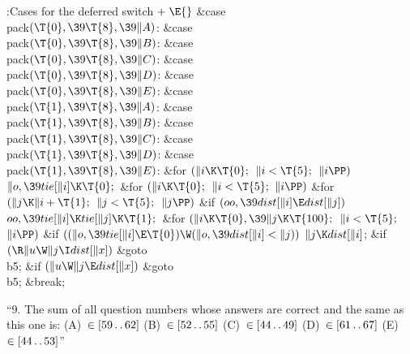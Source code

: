 \B{}:Cases for the deferred switch\X${}\mathrel+\E{}$\6
\4\&{case} \\{pack}${}(\T{0},\39\T{8},\39\|A){}$:\5
\&{case} \\{pack}${}(\T{0},\39\T{8},\39\|B){}$:\5
\&{case} \\{pack}${}(\T{0},\39\T{8},\39\|C){}$:\5
\&{case} \\{pack}${}(\T{0},\39\T{8},\39\|D){}$:\5
\&{case} \\{pack}${}(\T{0},\39\T{8},\39\|E){}$:\5
\&{case} \\{pack}${}(\T{1},\39\T{8},\39\|A){}$:\5
\&{case} \\{pack}${}(\T{1},\39\T{8},\39\|B){}$:\5
\&{case} \\{pack}${}(\T{1},\39\T{8},\39\|C){}$:\5
\&{case} \\{pack}${}(\T{1},\39\T{8},\39\|D){}$:\5
\&{case} \\{pack}${}(\T{1},\39\T{8},\39\|E){}$:\5
\&{for} ${}(\|i\K\T{0};{}$ ${}\|i<\T{5};{}$ ${}\|i\PP){}$\1\5
${}\|o,\39\\{tie}[\|i]\K\T{0};{}$\2\6
\&{for} ${}(\|i\K\T{0};{}$ ${}\|i<\T{5};{}$ ${}\|i\PP){}$\1\6
\&{for} ${}(\|j\K\|i+\T{1};{}$ ${}\|j<\T{5};{}$ ${}\|j\PP){}$\1\6
\&{if} ${}(\\{oo},\39\\{dist}[\|i]\E\\{dist}[\|j]){}$\1\5
${}\\{oo},\39\\{tie}[\|i]\K\\{tie}[\|j]\K\T{1};{}$\2\2\2\6
\&{for} ${}(\|i\K\T{0},\39\|j\K\T{100};{}$ ${}\|i<\T{5};{}$ ${}\|i\PP){}$\1\6
\&{if} ${}((\|o,\39\\{tie}[\|i]\E\T{0})\W(\|o,\39\\{dist}[\|i]<\|j)){}$\1\5
${}\|j\K\\{dist}[\|i]{}$;\2\2\6
\&{if} ${}(\R\|u\W\|j\I\\{dist}[\|x]){}$\1\5
\&{goto} \\{b5};\2\6
\&{if} ${}(\|u\W\|j\E\\{dist}[\|x]){}$\1\5
\&{goto} \\{b5};\5
\2\&{break};\par
\fi

``9. The sum of all question numbers whose answers are
correct and the same as
this one is:
(A)~$\in[59\mathinner{\ldotp\ldotp}62]$ (B)~$\in[52\mathinner{\ldotp\ldotp}55]$ (C)~$\in[44\mathinner{\ldotp\ldotp}49]$
(D)~$\in[61\mathinner{\ldotp\ldotp}67]$ (E)~$\in[44\mathinner{\ldotp\ldotp}53]$''

